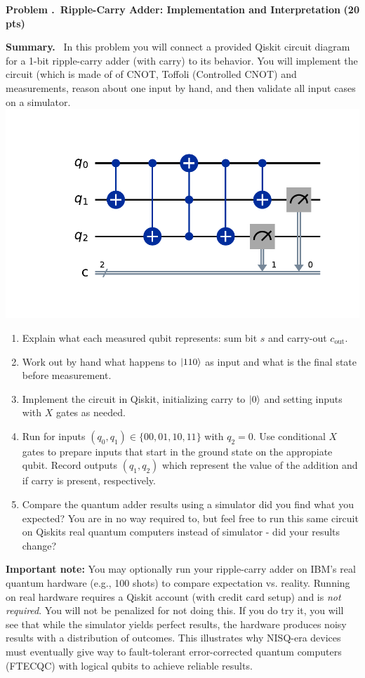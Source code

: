 \documentclass[11pt]{article}
\newcommand{\pts}[1]{\hfill{\small\bfseries(#1 pts)}}
\newenvironment{summary}{\vspace{2pt}\noindent\textbf{Summary.}~}{\par\vspace{6pt}}
\newcounter{problem}
\newcommand{\problem}[2]{%
  \refstepcounter{problem}
  \vspace{10pt}\noindent\textbf{Problem \theproblem.~#1} \pts{#2}\par
}
\begin{document}
\problem{Ripple-Carry Adder: Implementation and Interpretation}{20}
\begin{summary}
In this problem you will connect a provided Qiskit circuit diagram for a 1-bit ripple-carry adder (with carry) to its behavior. You will implement the circuit (which is made of of CNOT, Toffoli (Controlled CNOT) and measurements, reason about one input by hand, and then validate all input cases on a simulator.
\includegraphics[scale=.5]{qc_caserip.pdf}
\end{summary}

\begin{enumerate}[label=(\alph*)]
  \item Explain what each measured qubit represents: sum bit $s$ and carry-out $c_{\text{out}}$.
  \item Work out by hand what happens to $\ket{110}$ as input and what is the final state before measurement.
  \item Implement the circuit in Qiskit, initializing carry to $\ket{0}$ and setting inputs with $X$ gates as needed.
  \item Run for inputs $(q_0,q_1)\in\{00,01,10,11\}$ with $q_2=0$. Use conditional $X$ gates to prepare inputs that start in the ground state on the appropiate qubit. Record outputs $(q_1,q_2)$ which represent the value of the addition and if carry is present, respectively.
  \item Compare the quantum adder results using a simulator did you find what you expected? You are in no way required to, but feel free to run this same circuit on Qiskits real quantum computers instead of simulator - did your results change?
\end{enumerate}

\textbf{Important note:} You may optionally run your ripple-carry adder on IBM’s real quantum hardware (e.g., 100 shots) to compare expectation vs. reality. Running on real hardware requires a Qiskit account (with credit card setup) and is \emph{not required}. You will not be penalized for not doing this.  
If you do try it, you will see that while the simulator yields perfect results, the hardware produces noisy results with a distribution of outcomes. This illustrates why NISQ-era devices must eventually give way to fault-tolerant error-corrected quantum computers (FTECQC) with logical qubits to achieve reliable results.
\end{document}
